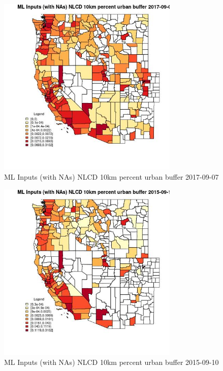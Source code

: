 \begin{figure} 
\centering  
\includegraphics[width=0.77\textwidth]{Code_Outputs/Report_ML_input_PM25_Step4_part_e_de_duplicated_aves_compiled_2019-05-21wNAs_CountyNLCD_10km_percent_urban_bufferMean2017-09-07.jpg} 
\caption{\label{fig:Report_ML_input_PM25_Step4_part_e_de_duplicated_aves_compiled_2019-05-21wNAsCountyNLCD_10km_percent_urban_bufferMean2017-09-07}ML Inputs (with NAs) NLCD 10km percent urban buffer 2017-09-07} 
\end{figure} 
 

\begin{figure} 
\centering  
\includegraphics[width=0.77\textwidth]{Code_Outputs/Report_ML_input_PM25_Step4_part_e_de_duplicated_aves_compiled_2019-05-21wNAs_CountyNLCD_10km_percent_urban_bufferMean2015-09-10.jpg} 
\caption{\label{fig:Report_ML_input_PM25_Step4_part_e_de_duplicated_aves_compiled_2019-05-21wNAsCountyNLCD_10km_percent_urban_bufferMean2015-09-10}ML Inputs (with NAs) NLCD 10km percent urban buffer 2015-09-10} 
\end{figure} 
 

